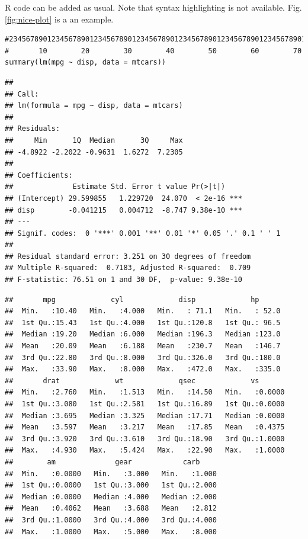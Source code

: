 \documentclass[]{rsos}%
\begin{document}
R code can be added as usual. Note that syntax highlighting is not available. Fig. \ref{fig:nice-plot} is a an example.

\begin{verbatim}
#23456789012345678901234567890123456789012345678901234567890123456789012345
#       10        20        30        40        50        60        70     
summary(lm(mpg ~ disp, data = mtcars))
\end{verbatim}

\begin{verbatim}
## 
## Call:
## lm(formula = mpg ~ disp, data = mtcars)
## 
## Residuals:
##     Min      1Q  Median      3Q     Max 
## -4.8922 -2.2022 -0.9631  1.6272  7.2305 
## 
## Coefficients:
##              Estimate Std. Error t value Pr(>|t|)    
## (Intercept) 29.599855   1.229720  24.070  < 2e-16 ***
## disp        -0.041215   0.004712  -8.747 9.38e-10 ***
## ---
## Signif. codes:  0 '***' 0.001 '**' 0.01 '*' 0.05 '.' 0.1 ' ' 1
## 
## Residual standard error: 3.251 on 30 degrees of freedom
## Multiple R-squared:  0.7183, Adjusted R-squared:  0.709 
## F-statistic: 76.51 on 1 and 30 DF,  p-value: 9.38e-10
\end{verbatim}

\begin{verbatim}
##       mpg             cyl             disp             hp       
##  Min.   :10.40   Min.   :4.000   Min.   : 71.1   Min.   : 52.0  
##  1st Qu.:15.43   1st Qu.:4.000   1st Qu.:120.8   1st Qu.: 96.5  
##  Median :19.20   Median :6.000   Median :196.3   Median :123.0  
##  Mean   :20.09   Mean   :6.188   Mean   :230.7   Mean   :146.7  
##  3rd Qu.:22.80   3rd Qu.:8.000   3rd Qu.:326.0   3rd Qu.:180.0  
##  Max.   :33.90   Max.   :8.000   Max.   :472.0   Max.   :335.0  
##       drat             wt             qsec             vs        
##  Min.   :2.760   Min.   :1.513   Min.   :14.50   Min.   :0.0000  
##  1st Qu.:3.080   1st Qu.:2.581   1st Qu.:16.89   1st Qu.:0.0000  
##  Median :3.695   Median :3.325   Median :17.71   Median :0.0000  
##  Mean   :3.597   Mean   :3.217   Mean   :17.85   Mean   :0.4375  
##  3rd Qu.:3.920   3rd Qu.:3.610   3rd Qu.:18.90   3rd Qu.:1.0000  
##  Max.   :4.930   Max.   :5.424   Max.   :22.90   Max.   :1.0000  
##        am              gear            carb      
##  Min.   :0.0000   Min.   :3.000   Min.   :1.000  
##  1st Qu.:0.0000   1st Qu.:3.000   1st Qu.:2.000  
##  Median :0.0000   Median :4.000   Median :2.000  
##  Mean   :0.4062   Mean   :3.688   Mean   :2.812  
##  3rd Qu.:1.0000   3rd Qu.:4.000   3rd Qu.:4.000  
##  Max.   :1.0000   Max.   :5.000   Max.   :8.000
\end{verbatim}
\end{document}
